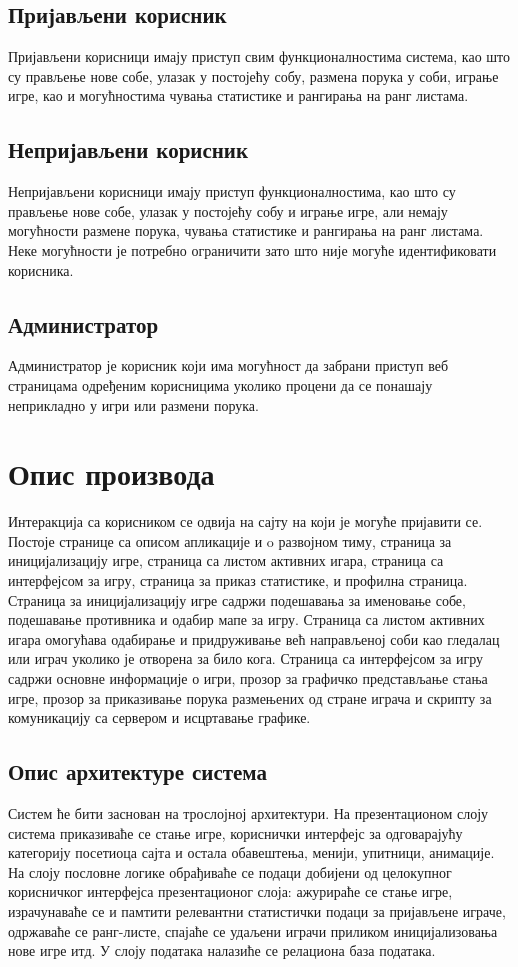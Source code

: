\subsection{Пријављени корисник}
Пријављени корисници имају приступ свим функционалностима система, као што су прављење нове собе, улазак у
постојећу собу, размена порука у соби, играње игре, као и могућностима чувања статистике и рангирања на ранг
листама.

\subsection{Непријављени корисник}
Непријављени корисници имају приступ функционалностима, као што су прављење нове собе, улазак у постојећу собу и
играње игре, али немају могућности размене порука, чувања статистике и рангирања на ранг листама. 
Неке могућности је потребно ограничити зато што није могуће идентификовати корисника.

\subsection{Администратор}
Администратор је корисник који има могућност да забрани приступ веб страницама одређеним корисницима 
уколико процени да се понашају неприкладно у игри или размени порука.



\section{Опис производа}
Интеракција са корисником се одвија на сајту на који је могуће пријавити се. Постоје странице са описом апликације и o развојном тиму,
страница за иницијализацију игре, страница са листом активних игара, страница са интерфејсом за игру, страница за приказ статистике, и профилна страница.
Страница за иницијализацију игре садржи подешавања за именовање собе, подешавање противника и одабир мапе за игру.
Страница са листом активних игара омогућава одабирање и придруживање већ направљеној соби као гледалац или играч
уколико је отворена за било кога. Страница са интерфејсом за игру садржи основне информације о игри,
прозор за графичко представљање стања игре, прозор за приказивање порука размењених од стране играча
и скрипту за комуникацију са сервером и исцртавање графике.

\subsection{Опис архитектуре система}
Систем ће бити заснован на трослојној архитектури. На презентационом слоју система приказиваће се стање игре,
кориснички интерфејс за одговарајућу категорију посетиоца сајта и остала обавештења, менији, упитници, анимације.
На слоју пословне логике обрађиваће се подаци добијени од целокупног корисничког интерфејса презентационог слоја:
ажурираће се стање игре, израчунаваће се и памтити релевантни статистички подаци за пријављене играче, одржаваће
се ранг-листе, спајаће се удаљени играчи приликом иницијализовања нове игре итд. У слоју података налазиће се
релациона база података.

